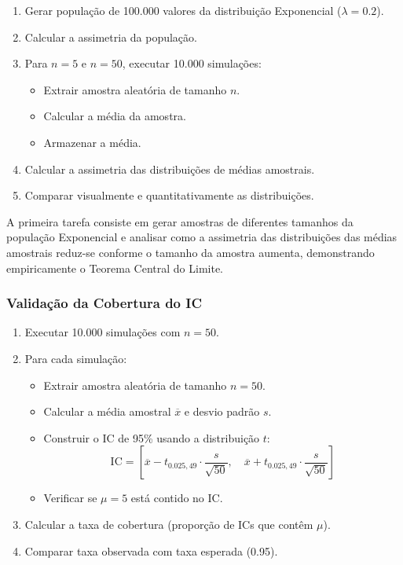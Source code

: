 \documentclass[12pt,a4paper]{article}
\begin{document}
\begin{enumerate}
  \item Gerar população de 100.000 valores da distribuição Exponencial ($\lambda = 0.2$).
  \item Calcular a assimetria da população.
  \item Para $n = 5$ e $n = 50$, executar 10.000 simulações:
  \begin{itemize}
    \item Extrair amostra aleatória de tamanho $n$.
    \item Calcular a média da amostra.
    \item Armazenar a média.
  \end{itemize}
  \item Calcular a assimetria das distribuições de médias amostrais.
  \item Comparar visualmente e quantitativamente as distribuições.
\end{enumerate}

A primeira tarefa consiste em gerar amostras de diferentes tamanhos da população Exponencial e analisar como a assimetria das distribuições das médias amostrais reduz-se conforme o tamanho da amostra aumenta, demonstrando empiricamente o Teorema Central do Limite.

\subsubsection{Validação da Cobertura do IC}

\begin{enumerate}
  \item Executar 10.000 simulações com $n = 50$.
  \item Para cada simulação:
  \begin{itemize}
    \item Extrair amostra aleatória de tamanho $n = 50$.
    \item Calcular a média amostral $\overline{x}$ e desvio padrão $s$.
    \item Construir o IC de 95\% usando a distribuição $t$: 
    \[ \text{IC} = \left[ \overline{x} - t_{0.025, 49} \cdot \frac{s}{\sqrt{50}}, \quad \overline{x} + t_{0.025, 49} \cdot \frac{s}{\sqrt{50}} \right] \]
    \item Verificar se $\mu = 5$ está contido no IC.
  \end{itemize}
  \item Calcular a taxa de cobertura (proporção de ICs que contêm $\mu$).
  \item Comparar taxa observada com taxa esperada (0.95).
\end{enumerate}
\end{document}
